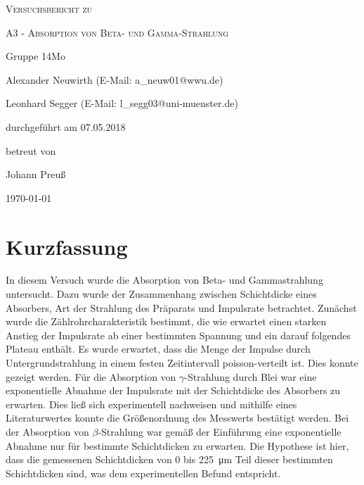 \documentclass[
	a4paper,
	12pt,
	pagesize,
	ngerman
]{scrartcl}
\begin{document}
	
	\begin{titlepage}
		\centering
		{\scshape\LARGE Versuchsbericht zu \par}
		\vspace{1cm}
		{\scshape\huge A3 - Absorption von Beta- und Gamma-Strahlung \par}
		\vspace{2.5cm}
		{\LARGE Gruppe 14Mo \par}
		\vspace{0.5cm}
		
		{\large Alexander Neuwirth (E-Mail: a\_neuw01@wwu.de) \par}
		{\large Leonhard Segger (E-Mail: l\_segg03@uni-muenster.de) \par}
		\vfill
		
		durchgeführt am 07.05.2018\par
		betreut von\par
		{\large Johann Preuß}  
		
		\vfill
		
		{\large \today\par}
	\end{titlepage}
	\tableofcontents
	\newpage

	\section{Kurzfassung}
	In diesem Versuch wurde die Absorption von Beta- und Gammastrahlung untersucht. %
	Dazu wurde der Zusammenhang zwischen Schichtdicke eines Absorbers, Art der Strahlung des Präparats und Impulsrate betrachtet.
	Zunächst wurde die Zählrohrcharakteristik bestimmt, die wie erwartet einen starken Anstieg der Impulsrate ab einer bestimmten Spannung und ein darauf folgendes Plateau enthält.
	Es wurde erwartet, dass die Menge der Impulse durch Untergrundstrahlung in einem festen Zeitintervall poisson-verteilt ist.
	Dies konnte gezeigt werden.
	Für die Absorption von $\gamma$-Strahlung durch Blei war eine exponentielle Abnahme der Impulsrate mit der Schichtdicke des Absorbers zu erwarten.
	Dies ließ sich experimentell nachweisen und mithilfe eines Literaturwertes konnte die Größenordnung des Messwerts bestätigt werden.
	Bei der Absorption von $\beta$-Strahlung war gemäß der Einführung  eine exponentielle Abnahme nur für bestimmte Schichtdicken zu erwarten. \cite{Einfuehrung}
	Die Hypothese ist hier, dass die gemessenen Schichtdicken von 0 bis \SI{225}{\micro \meter} Teil dieser bestimmten Schichtdicken sind, was dem experimentellen Befund entspricht.
	
\end{document}
